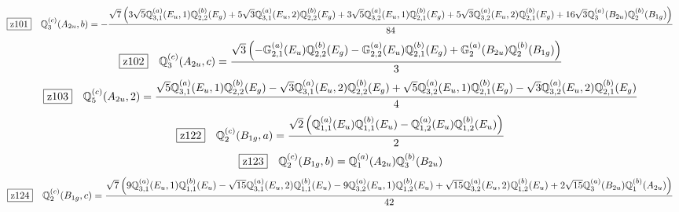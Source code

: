 \documentclass[fleqn,10pt,landscape]{jsarticle}
\begin{document}
\begin{dmath*}
\hspace*{3mm}\fbox{z101}\quad \mathbb{Q}_{3}^{(c)}(A_{2u},b)=- \frac{\sqrt{7} \left(3 \sqrt{5} \mathbb{Q}_{3,1}^{(a)}(E_{u},1) \mathbb{Q}_{2,2}^{(b)}(E_{g}) + 5 \sqrt{3} \mathbb{Q}_{3,1}^{(a)}(E_{u},2) \mathbb{Q}_{2,2}^{(b)}(E_{g}) + 3 \sqrt{5} \mathbb{Q}_{3,2}^{(a)}(E_{u},1) \mathbb{Q}_{2,1}^{(b)}(E_{g}) + 5 \sqrt{3} \mathbb{Q}_{3,2}^{(a)}(E_{u},2) \mathbb{Q}_{2,1}^{(b)}(E_{g}) + 16 \sqrt{3} \mathbb{Q}_{3}^{(a)}(B_{2u}) \mathbb{Q}_{2}^{(b)}(B_{1g})\right)}{84}
\end{dmath*}
\begin{dmath*}
\hspace*{3mm}\fbox{z102}\quad \mathbb{Q}_{3}^{(c)}(A_{2u},c)=\frac{\sqrt{3} \left(- \mathbb{G}_{2,1}^{(a)}(E_{u}) \mathbb{Q}_{2,2}^{(b)}(E_{g}) - \mathbb{G}_{2,2}^{(a)}(E_{u}) \mathbb{Q}_{2,1}^{(b)}(E_{g}) + \mathbb{G}_{2}^{(a)}(B_{2u}) \mathbb{Q}_{2}^{(b)}(B_{1g})\right)}{3}
\end{dmath*}
\begin{dmath*}
\hspace*{3mm}\fbox{z103}\quad \mathbb{Q}_{5}^{(c)}(A_{2u},2)=\frac{\sqrt{5} \mathbb{Q}_{3,1}^{(a)}(E_{u},1) \mathbb{Q}_{2,2}^{(b)}(E_{g}) - \sqrt{3} \mathbb{Q}_{3,1}^{(a)}(E_{u},2) \mathbb{Q}_{2,2}^{(b)}(E_{g}) + \sqrt{5} \mathbb{Q}_{3,2}^{(a)}(E_{u},1) \mathbb{Q}_{2,1}^{(b)}(E_{g}) - \sqrt{3} \mathbb{Q}_{3,2}^{(a)}(E_{u},2) \mathbb{Q}_{2,1}^{(b)}(E_{g})}{4}
\end{dmath*}
\begin{dmath*}
\hspace*{3mm}\fbox{z122}\quad \mathbb{Q}_{2}^{(c)}(B_{1g},a)=\frac{\sqrt{2} \left(\mathbb{Q}_{1,1}^{(a)}(E_{u}) \mathbb{Q}_{1,1}^{(b)}(E_{u}) - \mathbb{Q}_{1,2}^{(a)}(E_{u}) \mathbb{Q}_{1,2}^{(b)}(E_{u})\right)}{2}
\end{dmath*}
\begin{dmath*}
\hspace*{3mm}\fbox{z123}\quad \mathbb{Q}_{2}^{(c)}(B_{1g},b)=\mathbb{Q}_{1}^{(a)}(A_{2u}) \mathbb{Q}_{3}^{(b)}(B_{2u})
\end{dmath*}
\begin{dmath*}
\hspace*{3mm}\fbox{z124}\quad \mathbb{Q}_{2}^{(c)}(B_{1g},c)=\frac{\sqrt{7} \left(9 \mathbb{Q}_{3,1}^{(a)}(E_{u},1) \mathbb{Q}_{1,1}^{(b)}(E_{u}) - \sqrt{15} \mathbb{Q}_{3,1}^{(a)}(E_{u},2) \mathbb{Q}_{1,1}^{(b)}(E_{u}) - 9 \mathbb{Q}_{3,2}^{(a)}(E_{u},1) \mathbb{Q}_{1,2}^{(b)}(E_{u}) + \sqrt{15} \mathbb{Q}_{3,2}^{(a)}(E_{u},2) \mathbb{Q}_{1,2}^{(b)}(E_{u}) + 2 \sqrt{15} \mathbb{Q}_{3}^{(a)}(B_{2u}) \mathbb{Q}_{1}^{(b)}(A_{2u})\right)}{42}
\end{dmath*}
\end{document}

